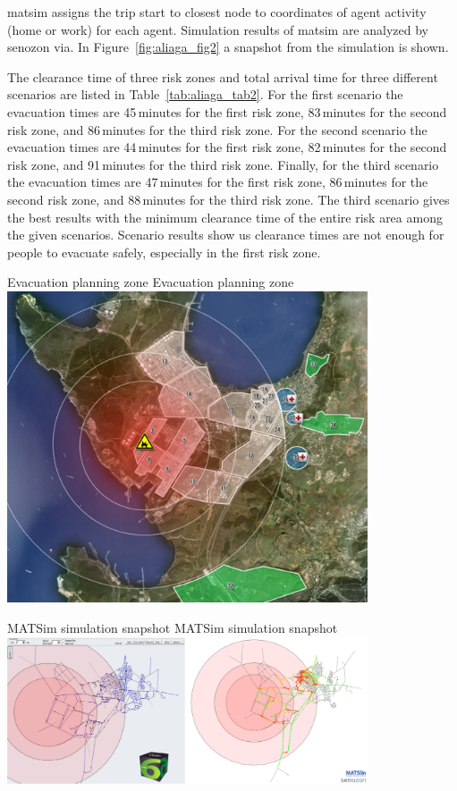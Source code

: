 \gls{matsim} assigns the trip start to closest node to coordinates of agent activity (\ie home or work) for each agent. Simulation results of \gls{matsim} are analyzed by \gls{senozon} \gls{via}. In Figure~\ref{fig:aliaga_fig2} a snapshot from the simulation is shown.

The clearance time of three risk zones and total arrival time for three different scenarios are listed in Table~\ref{tab:aliaga_tab2}. For the first scenario the evacuation times are 45\,minutes for the first risk zone, 83\,minutes for the second risk zone, and 86\,minutes for the third risk zone. For the second scenario the evacuation times are 44\,minutes for the first risk zone, 82\,minutes for the second risk zone, and 91\,minutes for the third risk zone. Finally, for the third scenario the evacuation times are 47\,minutes for the first risk zone, 86\,minutes for the second risk zone, and 88\,minutes for the third risk zone. The third scenario gives the best results with the minimum clearance time of the entire risk area among the given scenarios. Scenario results show us clearance times are not enough for people to evacuate safely, especially in the first risk zone.


\createfigure%
{Evacuation planning zone}%
{Evacuation planning zone}%
{\label{fig:aliaga_fig1}}%
{\includegraphics[width=0.8\textwidth, angle=0]{scenarios/figures/aliaga_fig1.png}}%
{}

\createfigure%
{MATSim simulation snapshot}%
{MATSim simulation snapshot}%
{\label{fig:aliaga_fig2}}%
{\includegraphics[width=0.8\textwidth, angle=0]{scenarios/figures/aliaga_fig2.png}}%
{}

